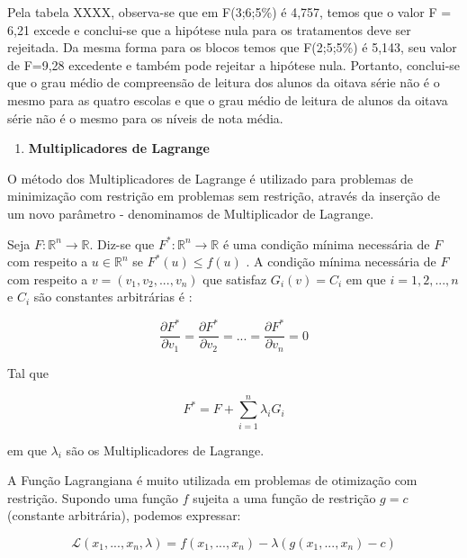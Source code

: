 \documentclass[
  openany]{book}
\providecommand{\tightlist}{%
  \setlength{\itemsep}{0pt}\setlength{\parskip}{0pt}}
\begin{document}
Pela tabela XXXX, observa-se que em F(3;6;5\%) é 4,757, temos que o valor F = 6,21 excede e conclui-se que a hipótese nula para os tratamentos deve ser rejeitada. Da mesma forma para os blocos temos que F(2;5;5\%) é 5,143, seu valor de F=9,28 excedente e também pode rejeitar a hipótese nula. Portanto, conclui-se que o grau médio de compreensão de leitura dos alunos da oitava série não é o mesmo para as quatro escolas e que o grau médio de leitura de alunos da oitava série não é o mesmo para os níveis de nota média.

\begin{enumerate}
\def\labelenumi{\arabic{enumi}.}
\setcounter{enumi}{17}
\tightlist
\item
  \textbf{Multiplicadores de Lagrange}
\end{enumerate}

O método dos Multiplicadores de Lagrange é utilizado para problemas de minimização com restrição em problemas sem restrição, através da inserção de um novo parâmetro - denominamos de Multiplicador de Lagrange.

Seja \(F:\mathbb{R}^n \rightarrow \mathbb{R}\). Diz-se que \(F^*:\mathbb{R}^n \rightarrow \mathbb{R}\) é uma condição mínima necessária de \(F\) com respeito a \(u \in \mathbb{R}^n\) se \(F^*(u)\leq f(u)\) \citep{cardoso2014analise}. A condição mínima necessária de \(F\) com respeito a \(v=(v_1,v_2,...,v_n)\) que satisfaz \(G_i(v)=C_i\) em que \(i=1,2,...,n\) e \(C_i\) são constantes arbitrárias é \citep{weinstock1974calculus}:

\begin{equation} 
\frac{\partial F^*}{\partial v_1}=\frac{\partial F^*}{\partial v_2}=...=\frac{\partial F^*}{\partial v_n}=0
  \label{eq:parcialfuncaolagrange}
\end{equation}

Tal que

\begin{equation} 
F^*=F+\displaystyle \sum^n_{i=1}\lambda_i G_i
  \label{eq:funcaomutlagrange}
\end{equation}

em que \(\lambda_i\) são os Multiplicadores de Lagrange.

A Função Lagrangiana é muito utilizada em problemas de otimização com restrição. Supondo uma função \(f\) sujeita a uma função de restrição \(g=c\) (constante arbitrária), podemos expressar:

\begin{equation} 
\mathcal{L}(x_1,...,x_n,\lambda)=f(x_1,...,x_n)-\lambda(g(x_1,...,x_n)-c)
  \label{eq:funcaolagrange}
\end{equation}
\end{document}
